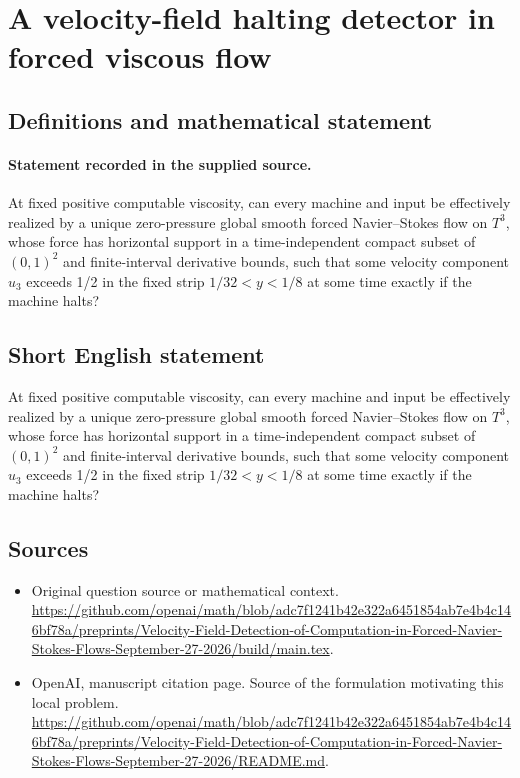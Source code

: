 \documentclass[11pt]{article}
\begin{document}
\section*{A velocity-field halting detector in forced viscous flow}\label{statement}
\subsection{Definitions and mathematical statement}
\paragraph{Statement recorded in the supplied source.}
At fixed positive computable viscosity, can every machine and input be effectively realized by a unique zero-pressure global smooth forced Navier–Stokes flow on $T^3$, whose force has horizontal support in a time-independent compact subset of $(0,1)^2$ and finite-interval derivative bounds, such that some velocity component $u_3$ exceeds 1/2 in the fixed strip $1/32<y<1/8$ at some time exactly if the machine halts?
\subsection{Short English statement}
At fixed positive computable viscosity, can every machine and input be effectively realized by a unique zero-pressure global smooth forced Navier–Stokes flow on $T^3$, whose force has horizontal support in a time-independent compact subset of $(0,1)^2$ and finite-interval derivative bounds, such that some velocity component $u_3$ exceeds 1/2 in the fixed strip $1/32<y<1/8$ at some time exactly if the machine halts?
\subsection{Sources}
\begin{itemize}
\item[S1] Original question source or mathematical context.
\url{https://github.com/openai/math/blob/adc7f1241b42e322a6451854ab7e4b4c146bf78a/preprints/Velocity-Field-Detection-of-Computation-in-Forced-Navier-Stokes-Flows-September-27-2026/build/main.tex}.
\item[S2] OpenAI, manuscript citation page. Source of the formulation motivating this local problem.
\url{https://github.com/openai/math/blob/adc7f1241b42e322a6451854ab7e4b4c146bf78a/preprints/Velocity-Field-Detection-of-Computation-in-Forced-Navier-Stokes-Flows-September-27-2026/README.md}.
\end{itemize}
\end{document}
